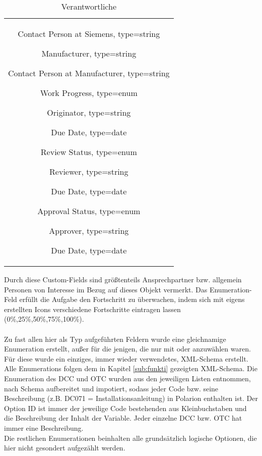 \begin{table}[H]
  \centering
  \begin{tabular}{c}
  \parbox{10cm}{
    \begin{compactitem}
    \item Contact Person at Siemens, type=string
    \item Manufacturer, type=string
    \item Contact Person at Manufacturer, type=string
    \item Work Progress, type=enum
    \item Originator, type=string
    \item Due Date, type=date
    \item Review Status, type=enum
    \item Reviewer, type=string
    \item Due Date, type=date
    \item Approval Status, type=enum
    \item Approver, type=string
    \item Due Date, type=date
\end{compactitem}}
  \end{tabular}
  \label{tab:seventh}
  \caption{Verantwortliche}
\end{table}
%
Durch diese Custom-Fields sind größtenteils Ansprechpartner bzw. allgemein Personen von Interesse im Bezug auf dieses Objekt vermerkt. Das  Enumeration-Feld erfüllt die Aufgabe den Fortschritt zu überwachen, indem sich mit eigens erstellten Icons verschiedene Fortschritte eintragen lassen (0\%,25\%,50\%,75\%,100\%).\\
\\
%
Zu fast allen hier als Typ  aufgeführten Feldern wurde eine gleichnamige Enumeration erstellt, außer für die jenigen, die nur mit  oder  anzuwählen waren. Für diese wurde ein einziges, immer wieder verwendetes, XML-Schema  erstellt. Alle Enumerations folgen dem in Kapitel \ref{sub:funkti} gezeigten XML-Schema. Die Enumeration des DCC und OTC wurden aus den jeweiligen Listen entnommen, nach Schema aufbereitet und impotiert, sodass jeder Code bzw. seine Beschreibung (z.B. DC071 = Installationsanleitung) in Polarion enthalten ist. Der Option ID ist immer der jeweilige Code bestehenden aus Kleinbuchstaben und die Beschreibung der Inhalt der  Variable. Jeder einzelne DCC bzw. OTC hat immer eine Beschreibung. \\
Die restlichen Enumerationen beinhalten alle grundsätzlich logische Optionen, die hier nicht gesondert aufgezählt werden. 
